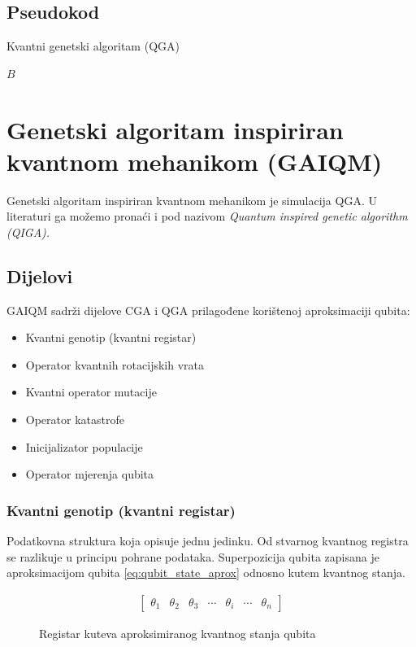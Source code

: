 \documentclass[times, utf8, zavrsni, numeric]{fer}
\begin{document}
\subsection{Pseudokod}
\begin{algorithm}
\caption{Kvantni genetski algoritam (QGA)}
\label{algo:qga}
\begin{algorithmic}
\ENDWHILE
\RETURN $B$
\end{algorithmic}
\end{algorithm}

\newpage

\section{Genetski algoritam inspiriran kvantnom mehanikom (GAIQM)}
Genetski algoritam inspiriran kvantnom mehanikom je simulacija QGA. U literaturi ga možemo pronaći i pod nazivom \it Quantum inspired genetic algorithm (QIGA)\rm. \citep{han_phd}

\subsection{Dijelovi}
GAIQM sadrži dijelove CGA i QGA prilagođene korištenoj aproksimaciji qubita:
\begin{itemize}
\item Kvantni genotip (kvantni registar)
\item Operator kvantnih rotacijskih vrata
\item Kvantni operator mutacije
\item Operator katastrofe
\item Inicijalizator populacije
\item Operator mjerenja qubita
\end{itemize}

\subsubsection{Kvantni genotip (kvantni registar)}
Podatkovna struktura koja opisuje jednu jedinku. Od stvarnog kvantnog registra se razlikuje u principu pohrane podataka. Superpozicija qubita zapisana je aproksimacijom qubita \ref{eq:qubit_state_aprox} odnosno kutem kvantnog stanja.
\begin{figure}[htb]
\centering
\begin{align*}
\begin{bmatrix}
\theta_1 & \theta_2 & \theta_3 & \cdots & \theta_i & \cdots & \theta_n
\end{bmatrix}
\end{align*}
\caption{Registar kuteva aproksimiranog kvantnog stanja qubita}
\end{figure}
\end{document}

